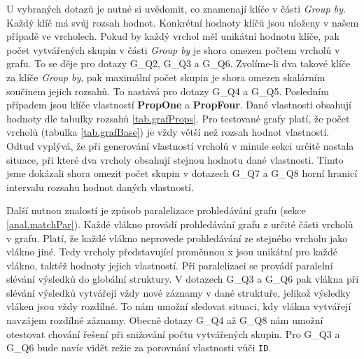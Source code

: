 U vybraných dotazů je nutné si uvědomit, co znamenají klíče v části \textit{Group by}.
Každý klíč má svůj rozsah hodnot.
Konkrétní hodnoty klíčů jsou uloženy v našem případě ve vrcholech.
Pokud by každý vrchol měl unikátní hodnotu klíče, pak počet vytvářených skupin v části \textit{Group by} je shora omezen počtem vrcholů v grafu.
To se děje pro dotazy G\_Q2, G\_Q3 a G\_Q6.
Zvolíme-li dva takové klíče za klíče \textit{Group by}, pak maximální počet skupin je shora omezen skalárním součinem jejich rozsahů.
To nastává pro dotazy  G\_Q4 a G\_Q5.
Posledním případem jsou klíče vlastností \textbf{PropOne} a \textbf{PropFour}.
Dané vlastnosti obsahují hodnoty dle tabulky rozsahů \ref{tab.grafProps}.
Pro testované grafy platí, že počet vrcholů (tabulka \ref{tab.grafBase}) je vždy větší než rozsah hodnot vlastností.
Odtud vyplývá, že při generování vlastností vrcholů v minule sekci určitě nastala situace, při které dva vrcholy obsahují stejnou hodnotu dané vlastnosti.
Tímto jsme dokázali shora omezit počet skupin v dotazech G\_Q7 a G\_Q8 horní hranicí intervalu rozsahu hodnot daných vlastností.

Další nutnou znalostí je způsob paralelizace prohledávání grafu (sekce \ref{anal.matchPar}).
Každé vlákno provádí prohledávání grafu z určité části vrcholů v grafu.
Platí, že každé vlákno neprovede prohledávání ze stejného vrcholu jako vlákno jiné.
Tedy vrcholy představující proměnnou x jsou unikátní pro každé vlákno, taktéž hodnoty jejich vlastností.
Při paralelizaci se provádí paralelní slévání výsledků do globální struktury.
V dotazech G\_Q3 a G\_Q6 pak vlákna při slévání výsledků vytvářejí vždy nové záznamy v dané struktuře, jelikož výsledky vláken jsou vždy rozdílné.  
To nám umožní sledovat situaci, kdy vlákna vytvářejí navzájem rozdílné záznamy.
Obecně dotazy G\_Q4 až G\_Q8 nám umožní otestovat chování řešení při snižování počtu vytvářených skupin.
Pro G\_Q3 a G\_Q6 bude navíc vidět režie za porovnání vlastnosti vůči \verb+ID+.

